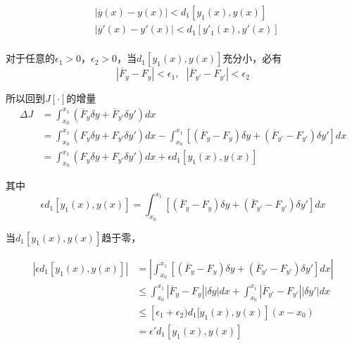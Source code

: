 \begin{equation}
    \begin{aligned}
        & |\overline{y}(x)-y(x)|<d_1[y_1(x),y(x)]\\
        & |\overline{y}'(x)-y'(x)|<d_1[y'_1(x),y'(x)]\\
    \end{aligned}
\end{equation}

对于任意的$\epsilon_1>0$，$\epsilon_2>0$，当$d_1[y_1(x),y(x)]$充分小，必有
\begin{equation}
    |\overline{F}_y-F_y|<\epsilon_1,\ \ \ |\overline{F}_{y'}-F_{y'}|<\epsilon_2 
\end{equation}

所以回到$J[\cdot]$的增量
\begin{equation}
    \begin{aligned}
        \Delta J &= \int_{x_0}^{x_1} (\overline{F}_y\delta y+\overline{F}_{y'}\delta y')dx\\
        & = \int_{x_0}^{x_1} (F_y\delta y+F_{y'}\delta y')dx-\int_{x_0}^{x_1} [(\overline{F}_y-F_y)\delta y+(\overline{F}_{y'}-F_{y'})\delta y']dx\\
        & = \int_{x_0}^{x_1} (F_y\delta y+F_{y'}\delta y')dx+\epsilon d_1[y_1(x),y(x)]
    \end{aligned}
\end{equation}

其中
\begin{equation}
    \epsilon d_1[y_1(x),y(x)]=\int_{x_0}^{x_1} [(\overline{F}_y-F_y)\delta y+(\overline{F}_{y'}-F_{y'})\delta y']dx
\end{equation}

当$d_1[y_1(x),y(x)]$趋于零，

\begin{equation}
    \begin{aligned}
        \left|\epsilon d_1[y_1(x),y(x)]\right|&=\left|\int_{x_0}^{x_1} [(\overline{F}_y-F_y)\delta y+(\overline{F}_{y'}-F_{y'})\delta y']dx\right|\\
        &\leqslant \int_{x_0}^{x_1}\left|\overline{F}_y-F_y\right|\left|\delta y\right|dx+\int_{x_0}^{x_1}\left|\overline{F}_{y'}-F_{y'}\right|\left|\delta y'\right|dx\\
        &\leqslant \left[\epsilon_1+\epsilon_2)d_1[y_1(x),y(x)\right](x-x_0)\\
        &=\epsilon'd_1\left[y_1(x),y(x)\right]
    \end{aligned}
\end{equation}

